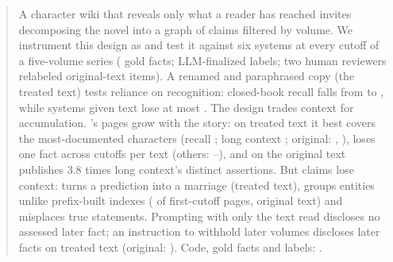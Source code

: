 \begin{abstract}
A character wiki that reveals only what a reader has reached invites decomposing the novel
into a graph of claims filtered by volume. We instrument this design as \sys and test it
against six systems at every cutoff of a five-volume series
( gold facts; LLM-finalized labels\ifnwhuman{}; two human reviewers
relabeled  original-text items\fi{}). A renamed and paraphrased copy (the
treated text) tests reliance on recognition: closed-book recall falls
from  to , while systems given text lose
at most . The design trades context for accumulation. \sys's
pages grow with the story: on treated text it best covers the most-documented characters
(recall ; long context ; original:
, ), loses one fact across cutoffs per text (others:
--), and on the original text publishes 3.8 times
long context's distinct assertions. But claims lose context: \sys turns a prediction into a
marriage (treated text), groups entities unlike prefix-built indexes
( of first-cutoff pages, original text) and misplaces true
statements. Prompting with only the text read discloses no assessed later fact; an
instruction to withhold later volumes discloses  later facts on
treated text (original: ). Code, gold facts and labels: \anonrepo.
\end{abstract}
